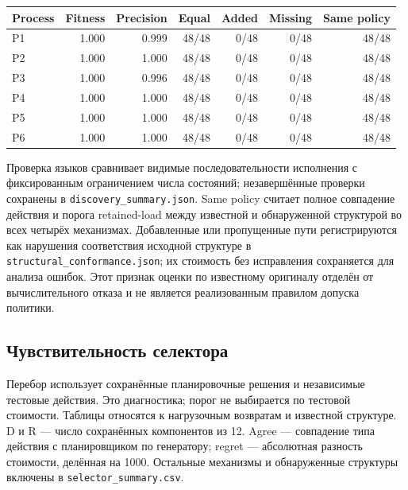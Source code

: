 \begin{center}\small\begin{tabular}{lrrrrrr}\toprule

Process & Fitness & Precision & Equal & Added & Missing & Same policy\\\midrule

P1 & 1.000 & 0.999 & 48/48 & 0/48 & 0/48 & 48/48\\

P2 & 1.000 & 1.000 & 48/48 & 0/48 & 0/48 & 48/48\\

P3 & 1.000 & 0.996 & 48/48 & 0/48 & 0/48 & 48/48\\

P4 & 1.000 & 1.000 & 48/48 & 0/48 & 0/48 & 48/48\\

P5 & 1.000 & 1.000 & 48/48 & 0/48 & 0/48 & 48/48\\

P6 & 1.000 & 1.000 & 48/48 & 0/48 & 0/48 & 48/48\\

\bottomrule\end{tabular}\end{center}

Проверка языков сравнивает видимые последовательности исполнения с фиксированным ограничением числа состояний; незавершённые проверки сохранены в \texttt{discovery\_summary.json}. Same policy считает полное совпадение действия и порога retained-load между известной и обнаруженной структурой во всех четырёх механизмах. Добавленные или пропущенные пути регистрируются как нарушения соответствия исходной структуре в \texttt{structural\_conformance.json}; их стоимость без исправления сохраняется для анализа ошибок. Этот признак оценки по известному оригиналу отделён от вычислительного отказа и не является реализованным правилом допуска политики.

\subsection{Чувствительность селектора}

Перебор использует сохранённые планировочные решения и независимые тестовые действия. Это диагностика; порог не выбирается по тестовой стоимости. Таблицы относятся к нагрузочным возвратам и известной структуре. D и R — число сохранённых компонентов из 12. Agree — совпадение типа действия с планировщиком по генератору; regret — абсолютная разность стоимости, делённая на 1000. Остальные механизмы и обнаруженные структуры включены в \texttt{selector\_summary.csv}.

